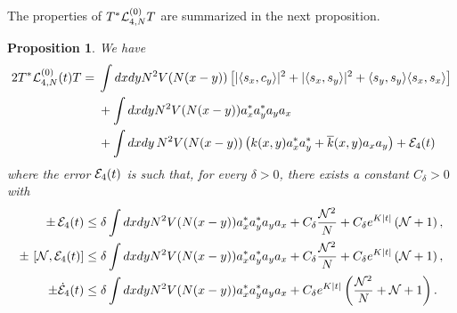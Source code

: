 \documentclass[11pt,a4paper]{article}
\newtheorem{proposition}[thm]{Proposition}
\newcommand{\ech}[2]{#2}	%
\newcommand{\ekt}{e^{K\lvert t\rvert}}	%
\newcommand{\cE}{{\cal E}}
\newcommand{\cL}{{\cal L}}
\newcommand{\cN}{{\cal N}}
\newcommand{\Ncal}{\mathcal{N}}		%
\begin{document}
The properties of $T^* \cL^{(0)}_{4,N} T$ are summarized in the next proposition. 
\begin{proposition}\label{prop:TL4T}
We have 
\begin{equation}\begin{split} 2 T^* \cL_{4,N}^{(0)} (t) T =\; & \int dx dy N^2 V (N (x-y)) \left[ |\langle s_x , c_y \rangle|^2  +  |\langle s_x , s_y \rangle|^2   + \langle s_y , s_y \rangle \langle s_x ,s_x \rangle \right] \\  &+ \int dx dy N^2 V (N (x-y)) a_x^* a_y^* a_y a_x \\ &+ \int dx dy \, N^2 V (N (x-y)) \left( k (x,y) a^*_x a^*_y + \overline{k} (x,y) a_x a_y \right) + \cE_4 (t) \end{split} \end{equation}
where the error $\cE_4 (t)$ is such that, for every $\delta > 0$, there exists a constant $C_\delta > 0$ with  
\begin{equation}\label{eq:TL4T-cl} 
\begin{split}
\pm \, \cE_4 (t) &\leq \delta \int dx dy N^2 V(N (x-y)) a_x^* a_y^* a_y a_x
+ C_\delta  \frac{\cN^2}{N}  + C_\delta \ech{\| \varphi_t^{(N)}
\|_{H^2}^2}{\ekt} \left(\cN + 1 \right), \\
\pm \, \left[ \cN , \cE_4 (t) \right]  &\leq  \delta \int dx dy N^2 V(N
(x-y)) a_x^* a_y^* a_y a_x + C_\delta \frac{\cN^2}{N} + C_\delta \ech{\|
\varphi_t^{(N)} \|_{H^2}^2}{\ekt} \left(\cN + 1 \right), \\
\pm \dot{\cE}_4 (t) &\leq 
\delta \int dx dy N^2 V(N (x-y)) a_x^* a_y^* a_y a_x + \ech{C_\delta \| \varphi_t^{(N)} \|_{H^4}^2  \frac{\cN^2}{N} \\ &\hspace{.5cm} + C_\delta \left(\| \varphi_t^{(N)} \|_{H^4} \| \varphi_t^{(N)} \|_{H^2} + \| \varphi_t^{(N)} \|_{H^2}^3 \right) \, \left(\cN + 1 \right)}{C_\delta \ekt \left(\frac{\Ncal^2}{N} +\Ncal + 1 \right)}.
\end{split}
\end{equation}
\end{proposition}
\end{document}
